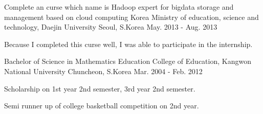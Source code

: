 

\begin{cventries}

  \cventry
    {Complete an curse which name is Hadoop expert for bigdata storage and management based on cloud computing} %
    {Korea Ministry of education, science and technology, Daejin University} %
    {Seoul, S.Korea} %
    {May. 2013 - Aug. 2013} %
    {
      \begin{cvitems} %
        \item {Because I completed this curse well, I was able to participate in the internship.}
      \end{cvitems}
    }

  \cventry
    {Bachelor of Science in Mathematics Education} %
    {College of Education, Kangwon National University} %
    {Chuncheon, S.Korea} %
    {Mar. 2004 - Feb. 2012} %
    {
      \begin{cvitems} %
        \item {Scholarship on 1st year 2nd semester, 3rd year 2nd semester.}
        \item {Semi runner up of college basketball competition on 2nd year.}
      \end{cvitems}
    }

\end{cventries}
